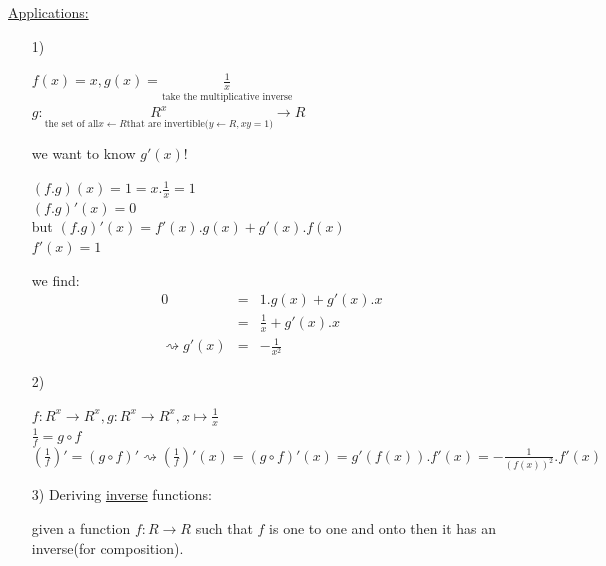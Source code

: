 \documentclass[a4paper, 12pt]{article}
\begin{document}
\underline{Applications:}\\
\begin{enumerate}
\item[1)]
\begin{center}
$f(x) = x, g(x) = \underset{\text{take the multiplicative inverse}}{\frac{1}{x}}$\\
$ g:\underset{\text{the set of all}x \leftarrow R\text{that are invertible(}y \leftarrow R, xy = 1\text{)}}{R^x}\rightarrow R$\\
\end{center}
we want to know $g'(x)$!\\
\begin{multicols}{2}
\begin{center}
$(f.g)(x) = 1 = x.\frac{1}{x} = 1$\\
$(f.g)'(x) = 0$\\
but $(f.g)'(x) = f'(x).g(x) + g'(x).f(x)$\\
$f'(x) = 1$\\
\end{center}
we find:
\begin{eqnarray*}
0 &=& 1.g(x) + g'(x).x\\
&=& \frac{1}{x} + g'(x).x\\
\rightsquigarrow g'(x)& = &-\frac{1}{x^2}
\end{eqnarray*}
\begin{center}
\end{center}
\end{multicols}
\item[2)]
\begin{center}
$f:R^x \rightarrow R^x, g:R^x \rightarrow R^x, x \mapsto \frac{1}{x}$\\
$\frac{1}{f} = g\circ f$\\
$(\frac{1}{f})' = (g\circ f)' \rightsquigarrow (\frac{1}{f})'(x) = (g\circ f)'(x) = g'(f(x)).f'(x) = -\frac{1}{(f(x))^2}.f'(x)$\\
\end{center}
\item[3)] Deriving \underline{inverse} functions:
\begin{multicols}{2}
\begin{center}
given a function $f:R \rightarrow R$ such that $f$ is one to one and onto then it has an inverse(for composition).\\

\end{center}
\end{multicols}
\end{enumerate}
\end{document}
